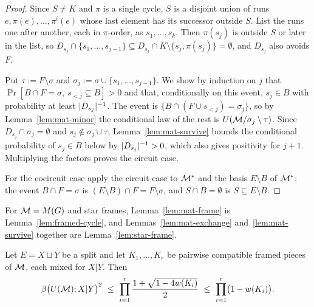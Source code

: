 \begin{proof}
Since $S\ne K$ and $\pi$ is a single cycle, $S$ is a disjoint union of runs $e,\pi(e),\dots,\pi^i(e)$ whose last element has its successor outside $S$. List the runs one after another, each in $\pi$-order, as $s_1,\dots,s_k$. Then $\pi(s_j)$ is outside $S$ or later in the list, so $D_{s_j}\cap\{s_1,\dots,s_{j-1}\}\subseteq D_{s_j}\cap K\setminus\{s_j,\pi(s_j)\}=\emptyset$, and $D_{s_j}$ also avoids $F$.

Put $\tau:=F\setminus\sigma$ and $\sigma_j:=\sigma\cup\{s_1,\dots,s_{j-1}\}$. We show by induction on $j$ that $\Pr[B\cap F=\sigma,\ s_{<j}\subseteq B]>0$ and that, conditionally on this event, $s_j\in B$ with probability at least $\lvert D_{s_j}\rvert^{-1}$. The event is $\{B\cap(F\cup s_{<j})=\sigma_j\}$, so by Lemma~\ref{lem:mat-minor} the conditional law of the rest is $U(\mathcal{M}/\sigma_j\setminus\tau)$. Since $D_{s_j}\cap\sigma_j=\emptyset$ and $s_j\notin\sigma_j\cup\tau$, Lemma~\ref{lem:mat-survive} bounds the conditional probability of $s_j\in B$ below by $\lvert D_{s_j}\rvert^{-1}>0$, which also gives positivity for $j+1$. Multiplying the factors proves the circuit case.

For the cocircuit case apply the circuit case to $\mathcal{M}^*$ and the basis $E\setminus B$ of $\mathcal{M}^*$: the event $B\cap F=\sigma$ is $(E\setminus B)\cap F=F\setminus\sigma$, and $S\cap B=\emptyset$ is $S\subseteq E\setminus B$.
\end{proof}

For $\mathcal{M}=M(G)$ and star frames, Lemma~\ref{lem:mat-frame} is Lemma~\ref{lem:framed-cycle}, and Lemmas~\ref{lem:mat-exchange} and~\ref{lem:mat-survive} together are Lemma~\ref{lem:star-frame}.

\begin{theorem}\label{thm:mat-local}
Let $E=X\sqcup Y$ be a split and let $K_1,\dots,K_r$ be pairwise compatible framed pieces of $\mathcal{M}$, each mixed for $X|Y$. Then
\[
  \beta\bigl(U(\cM);X|Y\bigr)^2\ \le\ \prod_{i=1}^r\frac{1+\sqrt{1-4w(K_i)}}2\ \le\ \prod_{i=1}^r\bigl(1-w(K_i)\bigr) .
\]
\end{theorem}

